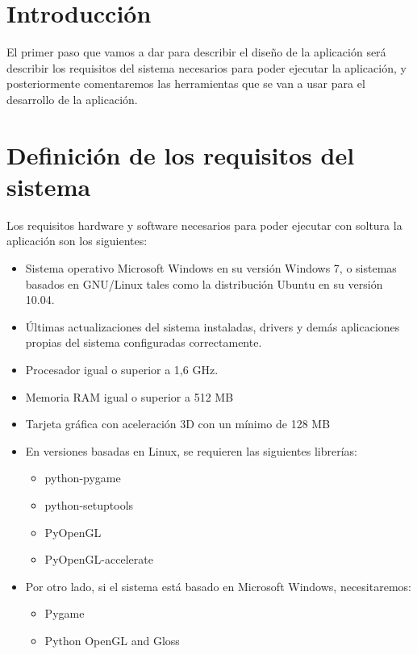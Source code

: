 

\section{Introducción}

El primer paso que vamos a dar para describir el diseño de la aplicación será describir los requisitos del
sistema necesarios para poder ejecutar la aplicación, y posteriormente comentaremos las herramientas que se
van a usar para el desarrollo de la aplicación.

\section{Definición de los requisitos del sistema}

Los requisitos hardware y software necesarios para poder ejecutar con soltura la aplicación son los siguientes:

\begin{itemize}
	\item Sistema operativo Microsoft Windows en su versión Windows 7, o sistemas basados en GNU/Linux tales como
		la distribución Ubuntu en su versión 10.04.
	\item Últimas actualizaciones del sistema instaladas, drivers y demás aplicaciones propias del sistema
		configuradas correctamente.
	\item Procesador igual o superior a 1,6 GHz.
	\item Memoria RAM igual o superior a 512 MB
	\item Tarjeta gráfica con aceleración 3D con un mínimo de 128 MB
	\item En versiones basadas en Linux, se requieren las siguientes librerías:
		\begin{itemize}
			\item python-pygame
			\item python-setuptools
			\item PyOpenGL
			\item PyOpenGL-accelerate
		\end{itemize}
	\item Por otro lado, si el sistema está basado en Microsoft Windows, necesitaremos:
		\begin{itemize}
			\item Pygame
			\item Python OpenGL and Gloss
		\end{itemize}
\end{itemize}

